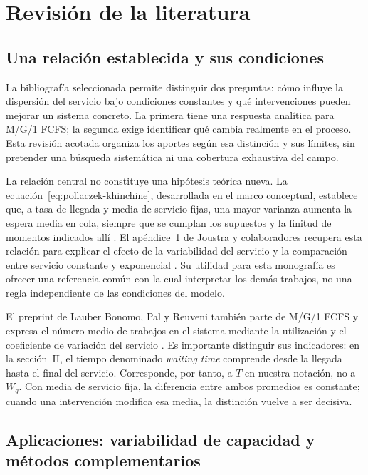 
\section{Revisión de la literatura}
\label{sec:revision-literatura}

\subsection{Una relación establecida y sus condiciones}
\label{subsec:literatura-relacion}

La bibliografía seleccionada permite distinguir dos preguntas: cómo influye la dispersión del servicio bajo condiciones constantes y qué intervenciones pueden mejorar un sistema concreto. La primera tiene una respuesta analítica para M/G/1 FCFS; la segunda exige identificar qué cambia realmente en el proceso. Esta revisión acotada organiza los aportes según esa distinción y sus límites, sin pretender una búsqueda sistemática ni una cobertura exhaustiva del campo.

La relación central no constituye una hipótesis teórica nueva. La ecuación~\ref{eq:pollaczek-khinchine}, desarrollada en el marco conceptual, establece que, a tasa de llegada y media de servicio fijas, una mayor varianza aumenta la espera media en cola, siempre que se cumplan los supuestos y la finitud de momentos indicados allí \cite{virtamoMG1}. El apéndice~1 de Joustra y colaboradores recupera esta relación para explicar el efecto de la variabilidad del servicio y la comparación entre servicio constante y exponencial \cite{joustra2012radioterapia}. Su utilidad para esta monografía es ofrecer una referencia común con la cual interpretar los demás trabajos, no una regla independiente de las condiciones del modelo.

El preprint de Lauber Bonomo, Pal y Reuveni también parte de M/G/1 FCFS y expresa el número medio de trabajos en el sistema mediante la utilización y el coeficiente de variación del servicio \cite{lauberbonomo2021resetting}. Es importante distinguir sus indicadores: en la sección~II, el tiempo denominado \emph{waiting time} comprende desde la llegada hasta el final del servicio. Corresponde, por tanto, a $T$ en nuestra notación, no a $W_q$. Con media de servicio fija, la diferencia entre ambos promedios es constante; cuando una intervención modifica esa media, la distinción vuelve a ser decisiva.

\subsection{Aplicaciones: variabilidad de capacidad y métodos complementarios}
\label{subsec:literatura-aplicaciones}

